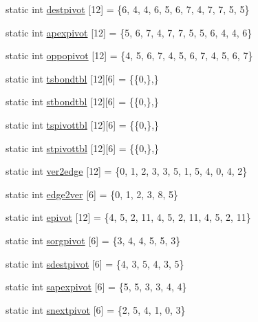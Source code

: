 \begin{DoxyCompactItemize}
static int \hyperlink{classtetgenmesh_a213a06f8f39654014405e4add71073d3}{destpivot} \mbox{[}12\mbox{]} = \{6, 4, 4, 6, 5, 6, 7, 4, 7, 7, 5, 5\}
\item 
static int \hyperlink{classtetgenmesh_a0322a7ed3ee115cb852ae8d46e2b261c}{apexpivot} \mbox{[}12\mbox{]} = \{5, 6, 7, 4, 7, 7, 5, 5, 6, 4, 4, 6\}
\item 
static int \hyperlink{classtetgenmesh_a6ca1afb964b1b34272d978ddbc0686a9}{oppopivot} \mbox{[}12\mbox{]} = \{4, 5, 6, 7, 4, 5, 6, 7, 4, 5, 6, 7\}
\item 
static int \hyperlink{classtetgenmesh_a053685b4d9d852983e842a33a95c31e4}{tsbondtbl} \mbox{[}12\mbox{]}\mbox{[}6\mbox{]} = \{\{0,\},\}
\item 
static int \hyperlink{classtetgenmesh_a8c25d3648eac238fe5cd43ed4b06c040}{stbondtbl} \mbox{[}12\mbox{]}\mbox{[}6\mbox{]} = \{\{0,\},\}
\item 
static int \hyperlink{classtetgenmesh_a9b4b95dfdce4c8c1ae1b4e683bfeca5e}{tspivottbl} \mbox{[}12\mbox{]}\mbox{[}6\mbox{]} = \{\{0,\},\}
\item 
static int \hyperlink{classtetgenmesh_ab90b809e43493efe2b4132ef5b056dba}{stpivottbl} \mbox{[}12\mbox{]}\mbox{[}6\mbox{]} = \{\{0,\},\}
\item 
static int \hyperlink{classtetgenmesh_ad70ef1b418a713939d2c2470de436afb}{ver2edge} \mbox{[}12\mbox{]} = \{0, 1, 2, 3, 3, 5, 1, 5, 4, 0, 4, 2\}
\item 
static int \hyperlink{classtetgenmesh_a5c068f480e2912a38c19bbbd492e2aae}{edge2ver} \mbox{[}6\mbox{]} = \{0, 1, 2, 3, 8, 5\}
\item 
static int \hyperlink{classtetgenmesh_ab15ad8f91a8c322861e8a399b4199a08}{epivot} \mbox{[}12\mbox{]} = \{4, 5, 2, 11, 4, 5, 2, 11, 4, 5, 2, 11\}
\item 
static int \hyperlink{classtetgenmesh_a36e2c583a5a4148c7ca53888b7bd928d}{sorgpivot} \mbox{[}6\mbox{]} = \{3, 4, 4, 5, 5, 3\}
\item 
static int \hyperlink{classtetgenmesh_a1d8ce836af65d2a6c2c008b43112ca5b}{sdestpivot} \mbox{[}6\mbox{]} = \{4, 3, 5, 4, 3, 5\}
\item 
static int \hyperlink{classtetgenmesh_a25610aea34045250cbd88b54d4734383}{sapexpivot} \mbox{[}6\mbox{]} = \{5, 5, 3, 3, 4, 4\}
\item 
static int \hyperlink{classtetgenmesh_a0d47762d99e1d47863062c532fe61122}{snextpivot} \mbox{[}6\mbox{]} = \{2, 5, 4, 1, 0, 3\}
\end{DoxyCompactItemize}


